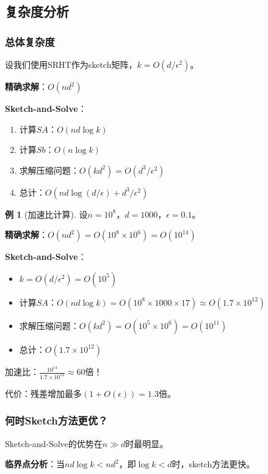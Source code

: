 \documentclass[11pt,a4paper]{ctexart}
\theoremstyle{definition}
\newtheorem{example}[theorem]{例}
\theoremstyle{remark}
\begin{document}
\subsection{复杂度分析}

\subsubsection{总体复杂度}

设我们使用SRHT作为sketch矩阵，$k = O(d/\epsilon^2)$。

\textbf{精确求解}：$O(nd^2)$

\textbf{Sketch-and-Solve}：
\begin{enumerate}
    \item 计算$SA$：$O(nd\log k)$
    \item 计算$Sb$：$O(n\log k)$
    \item 求解压缩问题：$O(kd^2) = O(d^3/\epsilon^2)$
    \item 总计：$O(nd\log(d/\epsilon) + d^3/\epsilon^2)$
\end{enumerate}

\begin{example}[加速比计算]
设$n = 10^8$，$d = 1000$，$\epsilon = 0.1$。

\textbf{精确求解}：$O(nd^2) = O(10^8 \times 10^6) = O(10^{14})$

\textbf{Sketch-and-Solve}：
\begin{itemize}
    \item $k = O(d/\epsilon^2) = O(10^5)$
    \item 计算$SA$：$O(nd\log k) = O(10^8 \times 1000 \times 17) \approx O(1.7 \times 10^{12})$
    \item 求解压缩问题：$O(kd^2) = O(10^5 \times 10^6) = O(10^{11})$
    \item 总计：$O(1.7 \times 10^{12})$
\end{itemize}

加速比：$\frac{10^{14}}{1.7 \times 10^{12}} \approx 60$倍！

代价：残差增加最多$(1+O(\epsilon)) = 1.3$倍。
\end{example}

\subsubsection{何时Sketch方法更优？}

Sketch-and-Solve的优势在$n \gg d$时最明显。

\textbf{临界点分析}：当$nd\log k < nd^2$，即$\log k < d$时，sketch方法更快。
\end{document}
